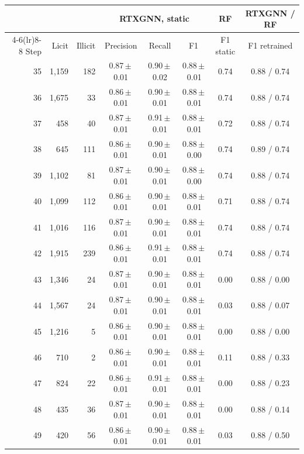\begin{tabular}{rrrccccc}
\toprule
 & & & \multicolumn{3}{c}{RTXGNN, static} & RF & RTXGNN / RF\\
\cmidrule(lr){4-6}\cmidrule(lr){8-8}
Step & Licit & Illicit & Precision & Recall & F1 & F1 static & F1 retrained\\
\midrule
35 & 1,159 & 182 & 0.87\,$\pm$\,0.01 & 0.90\,$\pm$\,0.02 & 0.88\,$\pm$\,0.01 & 0.74 & 0.88 / 0.74\\
36 & 1,675 & 33 & 0.86\,$\pm$\,0.01 & 0.90\,$\pm$\,0.01 & 0.88\,$\pm$\,0.01 & 0.74 & 0.88 / 0.74\\
37 & 458 & 40 & 0.87\,$\pm$\,0.01 & 0.91\,$\pm$\,0.01 & 0.88\,$\pm$\,0.01 & 0.72 & 0.88 / 0.74\\
38 & 645 & 111 & 0.86\,$\pm$\,0.01 & 0.90\,$\pm$\,0.01 & 0.88\,$\pm$\,0.00 & 0.74 & 0.89 / 0.74\\
39 & 1,102 & 81 & 0.87\,$\pm$\,0.01 & 0.90\,$\pm$\,0.01 & 0.88\,$\pm$\,0.00 & 0.74 & 0.88 / 0.74\\
40 & 1,099 & 112 & 0.86\,$\pm$\,0.01 & 0.90\,$\pm$\,0.01 & 0.88\,$\pm$\,0.01 & 0.71 & 0.88 / 0.74\\
41 & 1,016 & 116 & 0.87\,$\pm$\,0.01 & 0.90\,$\pm$\,0.01 & 0.88\,$\pm$\,0.01 & 0.74 & 0.88 / 0.74\\
42 & 1,915 & 239 & 0.86\,$\pm$\,0.01 & 0.91\,$\pm$\,0.01 & 0.88\,$\pm$\,0.01 & 0.74 & 0.88 / 0.74\\
43 & 1,346 & 24 & 0.87\,$\pm$\,0.01 & 0.90\,$\pm$\,0.01 & 0.88\,$\pm$\,0.01 & 0.00 & 0.88 / 0.00\\
44 & 1,567 & 24 & 0.87\,$\pm$\,0.01 & 0.90\,$\pm$\,0.01 & 0.88\,$\pm$\,0.01 & 0.03 & 0.88 / 0.07\\
45 & 1,216 & 5 & 0.86\,$\pm$\,0.01 & 0.90\,$\pm$\,0.01 & 0.88\,$\pm$\,0.01 & 0.00 & 0.88 / 0.00\\
46 & 710 & 2 & 0.86\,$\pm$\,0.01 & 0.90\,$\pm$\,0.01 & 0.88\,$\pm$\,0.01 & 0.11 & 0.88 / 0.33\\
47 & 824 & 22 & 0.86\,$\pm$\,0.01 & 0.91\,$\pm$\,0.01 & 0.88\,$\pm$\,0.01 & 0.00 & 0.88 / 0.23\\
48 & 435 & 36 & 0.87\,$\pm$\,0.01 & 0.90\,$\pm$\,0.01 & 0.88\,$\pm$\,0.01 & 0.00 & 0.88 / 0.14\\
49 & 420 & 56 & 0.86\,$\pm$\,0.01 & 0.90\,$\pm$\,0.01 & 0.88\,$\pm$\,0.01 & 0.03 & 0.88 / 0.50\\
\bottomrule
\end{tabular}
